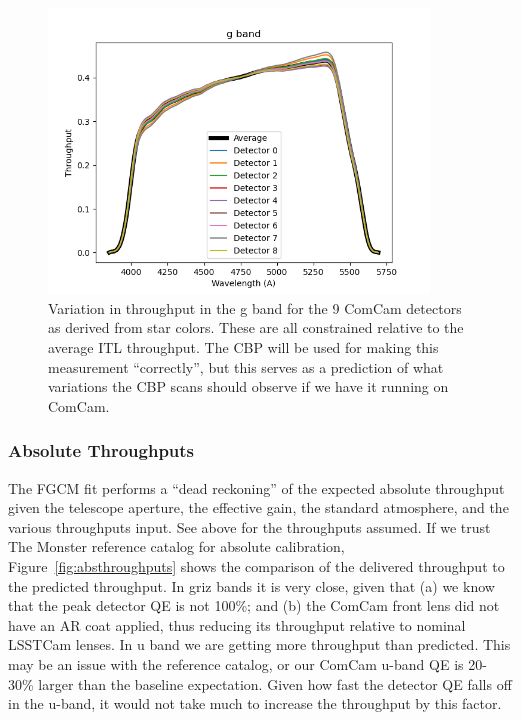 \begin{figure}
  \begin{center}
    \includegraphics[width=0.9\textwidth]{photometric_calibration_figures/detector_chromaticity_g.png}
  \end{center}
  \caption{Variation in throughput in the g band for the 9 ComCam detectors as
    derived from star colors. These are all constrained relative to the average
    ITL throughput. The CBP will be used for making this measurement
    ``correctly'', but this serves as a prediction of what variations the CBP
    scans should observe if we have it running on ComCam.}
\end{figure}

\subsubsection{Absolute Throughputs}

The FGCM fit performs a ``dead reckoning'' of the expected absolute throughput
given the telescope aperture, the effective gain, the standard atmosphere, and
the various throughputs input.  See above for the throughputs assumed.  If we
trust The Monster reference catalog for absolute calibration,
Figure~\ref{fig:absthroughputs} shows the comparison of the delivered
throughput to the predicted throughput.  In griz bands it is very close, given
that (a) we know that the peak detector QE is not 100\%; and (b) the ComCam
front lens did not have an AR coat applied, thus reducing its throughput
relative to nominal LSSTCam lenses.  In u band we are getting more throughput
than predicted.  This may be an issue with the reference catalog, or our ComCam
u-band QE is 20-30\% larger than the baseline expectation.  Given how fast the
detector QE falls off in the u-band, it would not take much to increase the
throughput by this factor.


